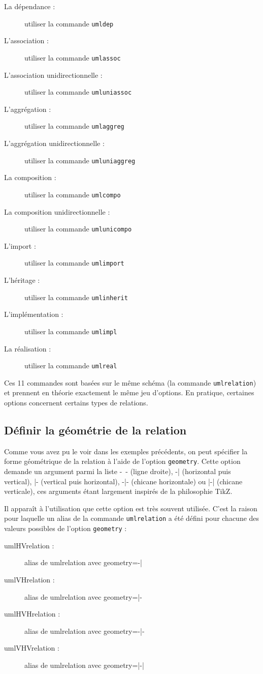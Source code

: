 \documentclass[a4paper,11pt]{report}
\begin{document}
\begin{description}
\item[La dépendance :] utiliser la commande {\tt umldep}
\item[L'association :] utiliser la commande {\tt umlassoc}
\item[L'association unidirectionnelle :] utiliser la commande {\tt umluniassoc}
\item[L'aggrégation :] utiliser la commande {\tt umlaggreg}
\item[L'aggrégation unidirectionnelle :] utiliser la commande {\tt umluniaggreg}
\item[La composition :] utiliser la commande {\tt umlcompo}
\item[La composition unidirectionnelle :] utiliser la commande {\tt umlunicompo}
\item[L'import :] utiliser la commande {\tt umlimport}
\item[L'héritage :] utiliser la commande {\tt umlinherit}
\item[L'implémentation :] utiliser la commande {\tt umlimpl}
\item[La réalisation :] utiliser la commande {\tt umlreal}
\end{description}

Ces 11 commandes sont basées sur le même schéma (la commande {\tt umlrelation}) et prennent en théorie exactement le même jeu d'options. En pratique, certaines options concernent certains types de relations.

\subsection{Définir la géométrie de la relation}\label{ss.relgeom}

Comme vous avez pu le voir dans les exemples précédents, on peut spécifier la forme géométrique de la relation à l'aide de l'option \hypertarget{geometry}{{\tt geometry}}. Cette option demande un argument parmi la liste -~- (ligne droite), -| (horizontal puis vertical), |- (vertical puis horizontal), -|- (chicane horizontale) ou |-| (chicane verticale), ces arguments étant largement inspirés de la philosophie TikZ.

Il apparaît à l'utilisation que cette option est très souvent utilisée. C'est la raison pour laquelle un alias de la commande {\tt umlrelation} a été défini pour chacune des valeurs possibles de l'option {\tt geometry} :

\begin{description}
\item[umlHVrelation :] alias de umlrelation avec geometry=-|
\item[umlVHrelation :] alias de umlrelation avec geometry=|-
\item[umlHVHrelation :] alias de umlrelation avec geometry=-|-
\item[umlVHVrelation :] alias de umlrelation avec geometry=|-|
\end{description}
\end{document}
